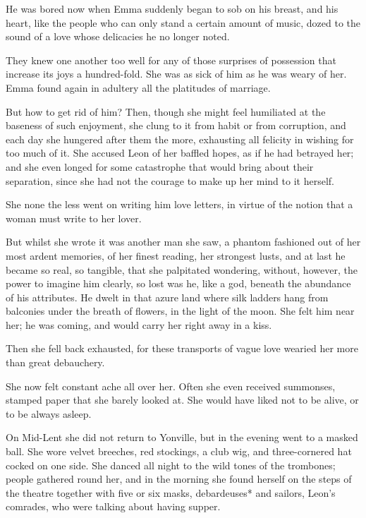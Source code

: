 \documentclass[11pt,twocolumn]{ltugboat}
\begin{document}
He was bored now when Emma suddenly began to sob on his breast, and his
heart, like the people who can only stand a certain amount of music,
dozed to the sound of a love whose delicacies he no longer noted.

They knew one another too well for any of those surprises of possession
that increase its joys a hundred-fold. She was as sick of him as he
was weary of her. Emma found again in adultery all the platitudes of
marriage.

But how to get rid of him? Then, though she might feel humiliated at
the baseness of such enjoyment, she clung to it from habit or from
corruption, and each day she hungered after them the more, exhausting
all felicity in wishing for too much of it. She accused Leon of her
baffled hopes, as if he had betrayed her; and she even longed for some
catastrophe that would bring about their separation, since she had not
the courage to make up her mind to it herself.

She none the less went on writing him love letters, in virtue of the
notion that a woman must write to her lover.

But whilst she wrote it was another man she saw, a phantom fashioned out
of her most ardent memories, of her finest reading, her strongest
lusts, and at last he became so real, so tangible, that she palpitated
wondering, without, however, the power to imagine him clearly, so lost
was he, like a god, beneath the abundance of his attributes. He dwelt in
that azure land where silk ladders hang from balconies under the breath
of flowers, in the light of the moon. She felt him near her; he was
coming, and would carry her right away in a kiss.

Then she fell back exhausted, for these transports of vague love wearied
her more than great debauchery.

She now felt constant ache all over her. Often she even received
summonses, stamped paper that she barely looked at. She would have liked
not to be alive, or to be always asleep.

On Mid-Lent she did not return to Yonville, but in the evening went to
a masked ball. She wore velvet breeches, red stockings, a club wig, and
three-cornered hat cocked on one side. She danced all night to the wild
tones of the trombones; people gathered round her, and in the morning
she found herself on the steps of the theatre together with five or six
masks, debardeuses* and sailors, Leon's comrades, who were talking about
having supper.
\end{document}
